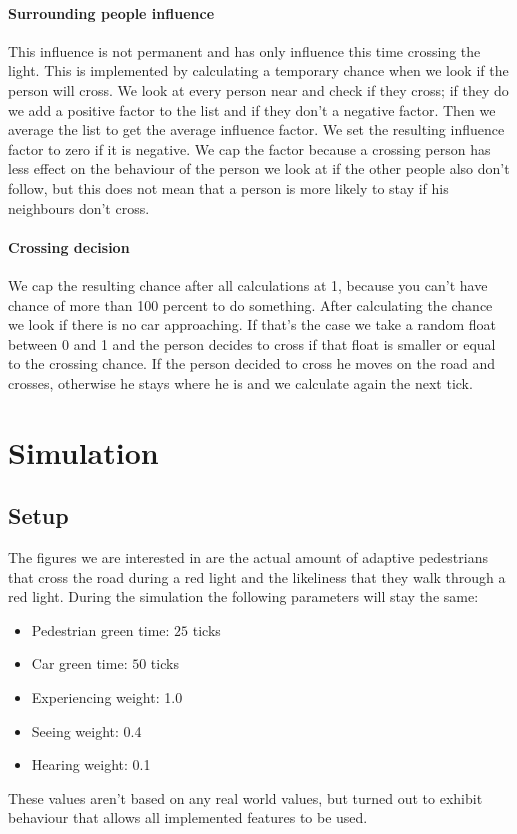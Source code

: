 \documentclass[a4paper]{article}
\begin{document}
\paragraph{Surrounding people influence}
This influence is not permanent and has only influence this time crossing the light. This is implemented by calculating a temporary chance when we look if the person will cross. We look at every person near and check if they cross; if they do we add a positive factor to the list and if they don't a negative factor. Then we average the list to get the average influence factor. We set the resulting influence factor to zero if it is negative. We cap the factor because a crossing person has less effect on the behaviour of the person we look at if the other people also don't follow, but this does not mean that a person is more likely to stay if his neighbours don't cross.


\paragraph{Crossing decision}
We cap the resulting chance after all calculations at 1, because you can't have chance of more than 100 percent to do something. After calculating the chance we look if there is no car approaching. If that's the case we take a random float between 0 and 1 and the person decides to cross if that float is smaller or equal to the crossing chance. If the person decided to cross he moves on the road and crosses, otherwise he stays where he is and we calculate again the next tick.

\clearpage

\section{Simulation}
\subsection{Setup}
The figures we are interested in are the actual amount of adaptive pedestrians that cross the road during a red light and the likeliness that they walk through a red light. During the simulation the following parameters will stay the same:
\begin{itemize}
\item Pedestrian green time: $25$ ticks
\item Car green time: $50$ ticks
\item Experiencing weight: 1.0
\item Seeing weight: 0.4
\item Hearing weight: 0.1
\end{itemize}
These values aren't based on any real world values, but turned out to exhibit behaviour that allows all implemented features to be used.
\end{document}
